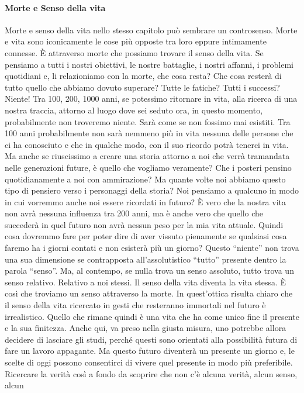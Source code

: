 \documentclass[12pt]{book} %
\begin{document}
\paragraph{Morte e Senso della vita}
Morte e senso della vita nello stesso capitolo può sembrare un controsenso. Morte e vita sono iconicamente le cose più
opposte tra loro eppure intimamente connesse. È attraverso morte che possiamo trovare il senso della vita. Se pensiamo
a tutti i nostri obiettivi, le nostre battaglie, i nostri affanni, i problemi quotidiani e, li relazioniamo con la
morte, che cosa resta? Che cosa resterà di tutto quello che abbiamo dovuto superare? Tutte le fatiche? Tutti i
successi? Niente! Tra 100, 200, 1000 anni, se potessimo ritornare in vita, alla ricerca di una nostra traccia, attorno
al luogo dove sei seduto ora, in questo momento, probabilmente non troveremo niente. Sarà come se non fossimo mai
esistiti. 
Tra 100 anni probabilmente non sarà nemmeno più in vita nessuna delle persone che ci ha
conosciuto e che in qualche modo, con il suo ricordo potrà tenerci in vita. Ma anche se riuscissimo a creare una storia
attorno a noi che verrà tramandata nelle generazioni future, è quello che vogliamo veramente? Che i posteri pensino
quotidianamente a noi con ammirazione? Ma quante volte noi abbiamo questo tipo di pensiero verso i personaggi della
storia? Noi pensiamo a qualcuno in modo in cui vorremmo anche noi essere ricordati in futuro? È vero che la nostra vita
non avrà nessuna influenza tra 200 anni, ma è anche vero che quello che succederà in quel futuro non avrà nessun peso
per la mia vita attuale. Quindi cosa dovremmo fare per poter dire di aver vissuto pienamente se qualsiasi cosa faremo
ha i giorni contati e non esisterà più un giorno? Questo “niente” non trova una sua dimensione se contrapposta
all'assolutistico “tutto” presente dentro la parola “senso”. Ma, al contempo, se nulla trova un
senso assoluto, tutto trova un senso relativo. Relativo a noi stessi. Il senso della vita diventa la vita stessa. 
È così che troviamo un senso attraverso la morte. In quest'ottica risulta chiaro che il senso della
vita ricercato in gesti che resteranno immortali nel futuro è irrealistico. Quello che rimane quindi è una vita che ha
come unico fine il presente e la sua finitezza. Anche qui, va preso nella giusta misura, uno potrebbe allora decidere
di lasciare gli studi, perché questi sono orientati alla possibilità futura di fare un lavoro appagante. Ma questo
futuro diventerà un presente un giorno e, le scelte di oggi possono consentirci di vivere quel presente in modo più
preferibile. Ricercare la verità così a fondo da scoprire che non c'è alcuna verità, alcun senso, alcun
\end{document}
